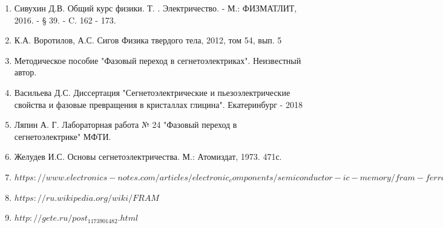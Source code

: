 \documentclass[a4paper]{article}
\begin{document}
\begin{enumerate}

\item

Сивухин Д.В. Общий курс физики. Т. . Электричество. - М.: ФИЗМАТЛИТ, 2016. - § 39. - C. 162 - 173. 

\item

К.А. Воротилов, А.С. Сигов Физика твердого тела, 2012, том 54, вып. 5

\item

Методическое пособие "Фазовый переход в сегнетоэлектриках". Неизвестный автор. 

\item

Васильева Д.С. Диссертация "Сегнетоэлектрические и пьезоэлектрические свойства и фазовые превращения в кристаллах глицина". Екатеринбург - 2018

\item

Ляпин А. Г. Лабораторная работа № 24 "Фазовый переход в сегнетоэлектрике"  МФТИ. 

\item

Желудев И.С. Основы сегнетоэлектричества. М.: Атомиздат, 1973. 471с.

\item

$https://www.electronics-notes.com/articles/electronic_components/semiconductor-ic-memory/fram-ferroelectric-ram-operation-technology.php$

\item

$https://ru.wikipedia.org/wiki/FRAM$

\item

$http://gete.ru/post_1173901482.html$

\end{enumerate}
\end{document}
